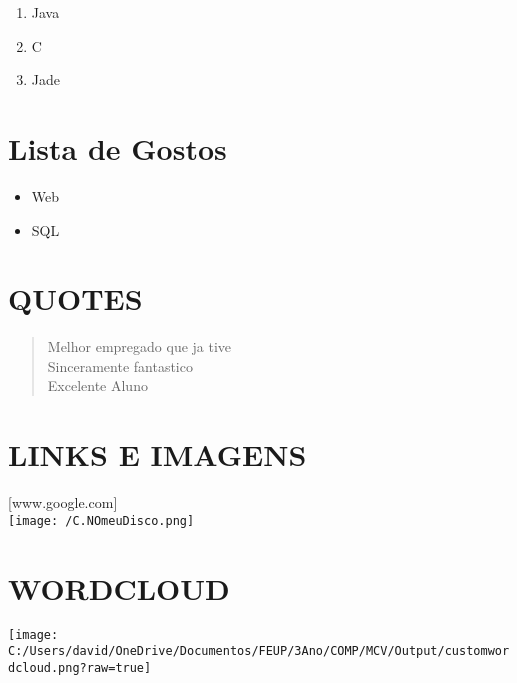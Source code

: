 \documentclass[]{article}
\providecommand{\tightlist}{%
  \setlength{\itemsep}{0pt}\setlength{\parskip}{0pt}}
\begin{document}
\begin{enumerate}
\tightlist
\item
  Java
\item
  C
\item
  Jade
\end{enumerate}

\section{Lista de Gostos}\label{lista-de-gostos}

\begin{itemize}
\tightlist
\item
  Web
\item
  SQL
\end{itemize}

\section{QUOTES}\label{quotes}

\begin{quote}
Melhor empregado que ja tive\\
Sinceramente fantastico\\
Excelente Aluno
\end{quote}

\section{LINKS E IMAGENS}\label{links-e-imagens}

{[}www.google.com{]}\\
\texttt{[image: /C.NOmeuDisco.png]}

\section{WORDCLOUD}\label{wordcloud}

\texttt{[image: C:/Users/david/OneDrive/Documentos/FEUP/3Ano/COMP/MCV/Output/customwordcloud.png?raw=true]}
\end{document}
